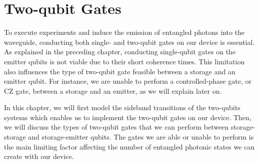 \chapter{Two-qubit Gates}
\label{chap:2_qubit_gates}
\thispagestyle{fancy}

To execute experiments and induce the emission of entangled photons into the waveguide, conducting both single- and two-qubit gates on our device is essential.
As explained in the preceding chapter, conducting single-qubit gates on the emitter qubits is not viable due to their short coherence times.
This limitation also influences the type of two-qubit gate feasible between a storage and an emitter qubit.
For instance, we are unable to perform a controlled-phase gate, or CZ gate, between a storage and an emitter, as we will explain later on.

In this chapter, we will first model the sideband transitions of the two-qubits systems which enables us to implement the two-qubit gates on our device.
Then, we will discuss the types of two-qubit gates that we can perform between storage-storage and storage-emitter qubits.
The gates we are able or unable to perform is the main limiting factor affecting the number of entangled photonic states we can create with our device.




